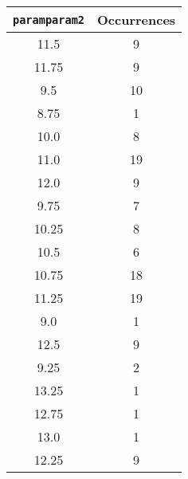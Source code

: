 \documentclass[letterpaper, 12pt]{article}
\begin{document}
\begin{longtable}{|c|c|}
\hline
\textbf{\texttt{paramparam2}} & \textbf{Occurrences} \\
\hline
11.5 & 9 \\
\hline
11.75 & 9 \\
\hline
9.5 & 10 \\
\hline
8.75 & 1 \\
\hline
10.0 & 8 \\
\hline
11.0 & 19 \\
\hline
12.0 & 9 \\
\hline
9.75 & 7 \\
\hline
10.25 & 8 \\
\hline
10.5 & 6 \\
\hline
10.75 & 18 \\
\hline
11.25 & 19 \\
\hline
9.0 & 1 \\
\hline
12.5 & 9 \\
\hline
9.25 & 2 \\
\hline
13.25 & 1 \\
\hline
12.75 & 1 \\
\hline
13.0 & 1 \\
\hline
12.25 & 9 \\
\hline
\end{longtable}
\end{document}
